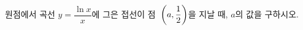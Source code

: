 원점에서 곡선 $y=\dfrac{\ln x}{x}$에 그은 접선이 점~$\left(a{,}\mkern3mu\mathopen{}\dfrac{1}{2}\right)$을 지날 때, $a$의 값을 구하시오.
